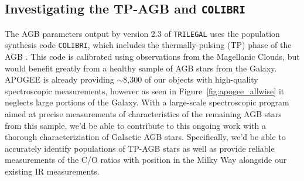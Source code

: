 \subsection{Investigating the TP-AGB and {\tt COLIBRI}}
The AGB parameters output by version 2.3 of {\tt TRILEGAL} uses the population synthesis code {\tt COLIBRI}, which includes the thermally-pulsing (TP) phase of the AGB \citep{2013MNRAS.434..488M}. This code is calibrated using observations from the Magellanic Clouds, but would benefit greatly from a healthy sample of AGB stars from the Galaxy. APOGEE is already providing $\sim$8,300 of our objects with high-quality spectroscopic measurements, however as seen in Figure~\ref{fig:apogee_allwise} it neglects large portions of the Galaxy. With a large-scale spectroscopic program aimed at precise measurements of characteristics of the remaining AGB stars from this sample, we'd be able to contribute to this ongoing work with a thorough characteriziation of Galactic AGB stars. Specifically, we'd be able to accurately identify populations of TP-AGB stars as well as provide reliable measurements of the C/O ratios with position in the Milky Way alongside our existing IR measurements.





